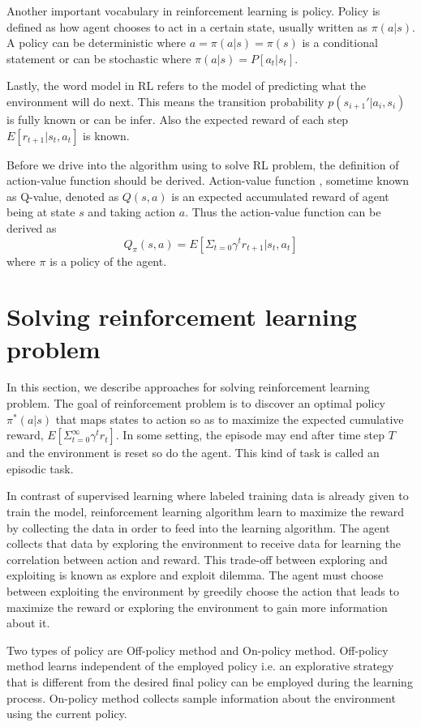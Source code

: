 \documentclass{article}
\begin{document}
Another important vocabulary in reinforcement learning is policy. Policy is defined as how agent chooses to act in a certain state, usually written as $\pi (a|s)$. A policy can be deterministic where $ a = \pi (a|s) = \pi(s)$ is a conditional statement or can be stochastic where $\pi (a|s) = P[a_t|s_t]$.

Lastly, the word model in RL refers to the model of predicting what the environment will do next. This means the transition probability $p(s_{i+1}'|a_{i},s_i)$ is fully known or can be infer. Also the expected reward of each step $E[r_{t+1}|s_t, a_t]$ is known.

Before we drive into the algorithm using to solve RL problem, the definition of action-value function should be derived. Action-value function , sometime known as Q-value, denoted as $Q(s,a)$ is an expected accumulated reward of agent being at state $s$ and taking action $a$. Thus the action-value function can be derived as $$ Q_{\pi}(s,a) = E[\Sigma_{t=0} \gamma^t r_{t+1}| s_t, a_t ]$$  where $\pi$ is a policy of the agent.


\section{Solving reinforcement learning problem}
 
In this section, we describe approaches for solving reinforcement learning problem. The goal of reinforcement problem is to discover an optimal policy $\pi^*(a|s)$ that maps states to action so as to maximize the expected cumulative reward, $E[\Sigma^\infty_{t=0} \gamma^t r_t]$. In some setting, the episode may end after time step $T$ and the environment is reset so do the agent. This kind of task is called an episodic task.

In contrast of supervised learning where labeled training data is already given to train the model, reinforcement learning algorithm learn to maximize the reward by collecting the data in order to feed into the learning algorithm. The agent collects that data by exploring the environment to receive data for learning the correlation between action and reward. This trade-off between exploring and exploiting is known as explore and exploit dilemma. The agent must choose between exploiting the environment by greedily choose the action that leads to maximize the reward or exploring the environment to gain more information about it. 

Two types of policy are Off-policy method and On-policy method. Off-policy method learns independent of the employed policy i.e. an explorative strategy that is different from the desired final policy can be employed during the learning process. On-policy method collects sample information about the environment using the current policy.
  
\end{document}
